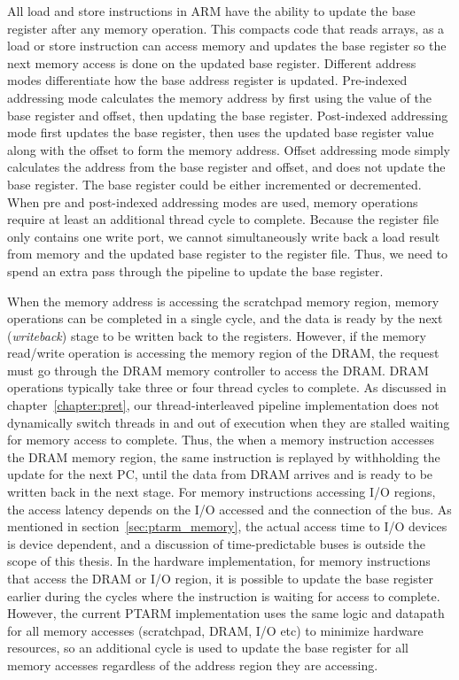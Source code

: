 All load and store instructions in ARM have the ability to update the base register after any memory operation. 
This compacts code that reads arrays, as a load or store instruction can access memory and updates the base register so the next memory access is done on the updated base register.
Different address modes differentiate how the base address register is updated. 
Pre-indexed addressing mode calculates the memory address by first using the value of the base register and offset, then updating the base register. 
Post-indexed addressing mode first updates the base register, then uses the updated base register value along with the offset to form the memory address.
Offset addressing mode simply calculates the address from the base register and offset, and does not update the base register. 
The base register could be either incremented or decremented. 
When pre and post-indexed addressing modes are used, memory operations require at least an additional thread cycle to complete.
Because the register file only contains one write port, we cannot simultaneously write back a load result from memory and the updated base register to the register file. 
Thus, we need to spend an extra pass through the pipeline to update the base register.

When the memory address is accessing the scratchpad memory region, memory operations can be completed in a single cycle, and the data is ready by the next (\emph{writeback}) stage to be written back to the registers.
However, if the memory read/write operation is accessing the memory region of the DRAM, the request must go through the DRAM memory controller to access the DRAM. 
DRAM operations typically take three or four thread cycles to complete. 
As discussed in chapter~\ref{chapter:pret}, our thread-interleaved pipeline implementation does not dynamically switch threads in and out of execution when they are stalled waiting for memory access to complete. 
Thus, the when a memory instruction accesses the DRAM memory region, the same instruction is replayed by withholding the update for the next PC, until the data from DRAM arrives and is ready to be written back in the next stage.
For memory instructions accessing I/O regions, the access latency depends on the I/O accessed and the connection of the bus.  
As mentioned in section~\ref{sec:ptarm_memory}, the actual access time to I/O devices is device dependent, and a discussion of time-predictable buses is outside the scope of this thesis.
In the hardware implementation, for memory instructions that access the DRAM or I/O region, it is possible to update the base register earlier during the cycles where the instruction is waiting for access to complete.
However, the current PTARM implementation uses the same logic and datapath for all memory accesses (scratchpad, DRAM, I/O etc) to minimize hardware resources, so an additional cycle is used to update the base register for all memory accesses regardless of the address region they are accessing.

